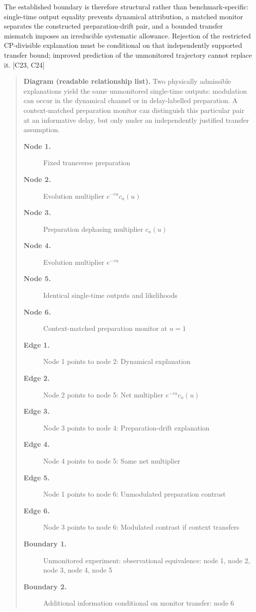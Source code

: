 \documentclass[11pt]{article}
\begin{document}
The established boundary is therefore structural rather than benchmark-specific: single-time output equality prevents dynamical attribution, a matched monitor separates the constructed preparation-drift pair, and a bounded transfer mismatch imposes an irreducible systematic allowance. Rejection of the restricted CP-divisible explanation must be conditional on that independently supported transfer bound; improved prediction of the unmonitored trajectory cannot replace it. [C23, C24]

\begin{quote}
\textbf{Diagram (readable relationship list).} Two physically admissible explanations yield the same unmonitored single-time outputs: modulation can occur in the dynamical channel or in delay-labelled preparation. A context-matched preparation monitor can distinguish this particular pair at an informative delay, but only under an independently justified transfer assumption.
\begin{description}
\item[\textbf{Node 1.}] Fixed transverse preparation
\item[\textbf{Node 2.}] Evolution multiplier $e^{-ru}c_a(u)$
\item[\textbf{Node 3.}] Preparation dephasing multiplier $c_a(u)$
\item[\textbf{Node 4.}] Evolution multiplier $e^{-ru}$
\item[\textbf{Node 5.}] Identical single-time outputs and likelihoods
\item[\textbf{Node 6.}] Context-matched preparation monitor at $u=1$
\item[\textbf{Edge 1.}] Node 1 points to node 2: Dynamical explanation
\item[\textbf{Edge 2.}] Node 2 points to node 5: Net multiplier $e^{-ru}c_a(u)$
\item[\textbf{Edge 3.}] Node 3 points to node 4: Preparation-drift explanation
\item[\textbf{Edge 4.}] Node 4 points to node 5: Same net multiplier
\item[\textbf{Edge 5.}] Node 1 points to node 6: Unmodulated preparation contrast
\item[\textbf{Edge 6.}] Node 3 points to node 6: Modulated contrast if context transfers
\item[\textbf{Boundary 1.}] Unmonitored experiment: observational equivalence: node 1, node 2, node 3, node 4, node 5
\item[\textbf{Boundary 2.}] Additional information conditional on monitor transfer: node 6
\end{description}
\par{}
\end{quote}
\end{document}
